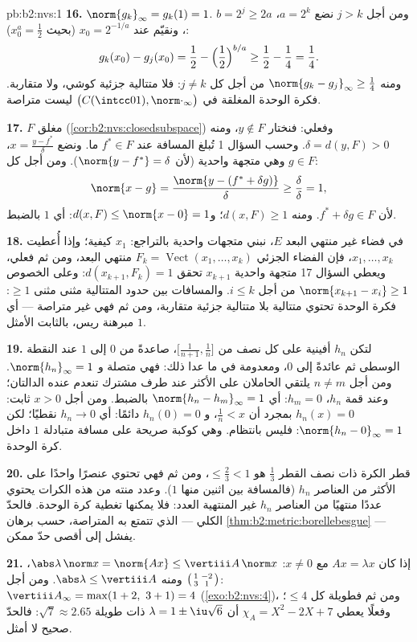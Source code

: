 \begin{solution}{pb:b2:nvs:1}
\textbf{16.} $\norm{g_k}_\infty = g_k(1) = 1$. ومن أجل $j > k$ نضع
$a = 2^k$، $b = 2^j \geq 2a$، ونقيّم عند $x_0 = 2^{-1/a}$
(بحيث $x_0^a = \frac12$):
\[
g_k(x_0) - g_j(x_0) = \frac12 - \Bigl(\frac12\Bigr)^{b/a}
\geq \frac12 - \frac14 = \frac14 .
\]
ومنه $\norm{g_k - g_j}_\infty \geq \frac14$ من أجل كل $j \neq k$: فلا
متتالية جزئية كوشي، ولا متقاربة. فكرة الوحدة المغلقة في
$\bigl(C(\intcc01), \norm\cdot_\infty\bigr)$ ليست متراصة.

\textbf{17.} $F$ مغلق (\cref{cor:b2:nvs:closedsubspace})
وفعلي: فنختار $y \notin F$، ومنه $\delta = d(y, F) > 0$. وحسب
السؤال 1 تُبلغ المسافة عند $f^* \in F$ ما. ونضع $x
= \frac{y - f^*}{\delta}$، وهي متجهة واحدية (لأن $\norm{y - f^*} =
\delta$). ومن أجل كل $g \in F$:
\[
\norm{x - g} = \frac{\norm{y - (f^* + \delta g)}}{\delta}
\geq \frac{\delta}{\delta} = 1 ,
\]
لأن $f^* + \delta g \in F$. ومنه $d(x, F) \geq 1$؛ و$d(x,
F) \leq \norm{x - 0} = 1$: أي $1$ بالضبط.

\textbf{18.} في فضاء غير منتهي البعد $E$، نبني متجهات واحدية
بالتراجع: $x_1$ كيفية؛ وإذا أُعطيت $x_1, \dots, x_k$، فإن
الفضاء الجزئي $F_k = \operatorname{Vect}(x_1, \dots, x_k)$ منتهي
البعد، ومن ثم فعلي، ويعطي السؤال 17 متجهة واحدية
$x_{k+1}$ تحقق $d(x_{k+1}, F_k) = 1$: وعلى الخصوص
$\norm{x_{k+1} - x_i} \geq 1$ من أجل $i \leq k$. والمسافات بين حدود المتتالية مثنى مثنى
$\geq 1$: فكرة الوحدة تحتوي متتالية
بلا متتالية جزئية متقاربة، ومن ثم فهي غير متراصة ---
أي مبرهنة ريس، بالثابت الأمثل $1$.

\textbf{19.} لتكن $h_n$ أفينية على كل نصف من
$\bigl[\frac1{n+1}, \frac1n\bigr]$، صاعدةً من $0$ إلى $1$ عند
النقطة الوسطى ثم عائدةً إلى $0$، ومعدومة في ما عدا ذلك: فهي متصلة و
$\norm{h_n}_\infty = 1$. ومن أجل $n \neq m$ يلتقي الحاملان على
الأكثر عند طرف مشترك تنعدم عنده الدالتان؛ وعند قمة
$h_n$، $h_m = 0$: أي $\norm{h_n - h_m}_\infty = 1$ بالضبط. ومن أجل
$x > 0$ ثابت: $h_n(x) = 0$ بمجرد أن $\frac1n < x$، و
$h_n(0) = 0$ دائمًا: أي $h_n \to 0$ نقطيًا؛ لكن
$\norm{h_n - 0}_\infty = 1$: فليس بانتظام. وهي كوكبة
صريحة على مسافة متبادلة $1$ داخل كرة الوحدة.

\textbf{20.} قطر الكرة ذات نصف القطر $\frac13$ هو $\leq
\frac23 < 1$، ومن ثم فهي تحتوي عنصرًا واحدًا على الأكثر من العناصر $h_n$ (فالمسافة بين اثنين منها
$1$). وعدد منته من هذه الكرات يحتوي عددًا منتهيًا
من العناصر $h_n$ غير المنتهية العدد: فلا يمكنها تغطية كرة الوحدة.
فالحدّ الكلي --- الذي تتمتع به  المتراصة، حسب
برهان \cref{thm:b2:metric:borellebesgue} --- يفشل إلى أقصى
حدّ ممكن.

\textbf{21.} إذا كان $Ax = \lambda x$ مع $x \neq 0$:
$\abs\lambda\,\norm x = \norm{Ax} \leq \vertiii A\,\norm x$،
ومنه $\abs\lambda \leq \vertiii A$. ومن أجل
$\begin{psmallmatrix}1 & -2\\ 3 & 1\end{psmallmatrix}$:
$\vertiii A_\infty = \max(1 + 2,\ 3 + 1) = 4$
(\cref{exo:b2:nvs:4})، ومن ثم فطويلة كل  $\leq
4$؛ وفعلًا يعطي $\chi_A = X^2 - 2X + 7$ أن $\lambda = 1 \pm
\iu\sqrt6$ ذات طويلة $\sqrt7 \approx 2.65$: فالحدّ
صحيح لا أمثل.


\end{solution}
